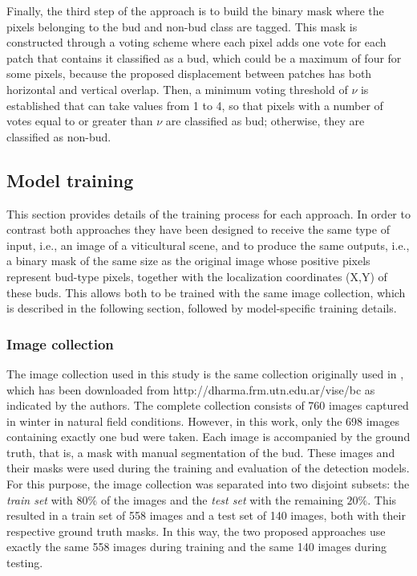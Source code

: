 \documentclass[a4paper,authoryear,review]{elsarticle}
\begin{document}
Finally, the third step of the approach is to build the binary mask where the pixels belonging to the bud and non-bud class are tagged. This mask is constructed through a voting scheme where each pixel adds one vote for each patch that contains it classified as a bud, which could be a maximum of four for some pixels, because the proposed displacement between patches has both horizontal and vertical overlap. Then, a minimum voting threshold of $\nu$ is established that can take values from 1 to 4, so that pixels with a number of votes equal to or greater than $\nu$ are classified as bud; otherwise, they are classified as non-bud. 

\subsection{Model training}
\label{sec:train}

This section provides details of the training process for each approach. In order to contrast both approaches they have been designed to receive the same type of input, i.e., an image of a viticultural scene, and to produce the same outputs, i.e., a binary mask of the same size as the original image whose positive pixels represent bud-type pixels, together with the  localization coordinates (X,Y) of these buds. This allows both to be trained with the same image collection, which is described in the following section, followed by model-specific training details.

\subsubsection{Image collection}
\label{sec:collection}

The image collection used in this study is the same collection originally used in \citet{perez2017image}, which has been downloaded from http://dharma.frm.utn.edu.ar/vise/bc as indicated by the authors. The complete collection consists of 760 images captured in winter in natural field conditions. However, in this work, only the 698 images containing exactly one bud were taken. Each image is accompanied by the ground truth, that is, a mask with manual segmentation of the bud. These images and their masks were used during the training and evaluation of the detection models. For this purpose, the image collection was separated into two disjoint subsets: the \emph{train set} with $80\%$ of the images and the \emph{test set} with the remaining  $20\%$. This resulted in a train set of 558 images and a test set of 140 images, both with their respective ground truth masks. In this way, the two proposed approaches use exactly the same 558 images during training and the same 140 images during testing.
\end{document}
